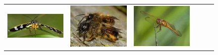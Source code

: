 \begin{figure}
\begin{tabular}{m{.01\linewidth} m{.16\linewidth} m{.16\linewidth} m{.16\linewidth} m{.16\linewidth} m{.16\linewidth}}
    \includegraphics[width=\linewidth]{../style/figures/flickr_on_flickr/pred_style_Macro/1.jpg} &
    \includegraphics[width=\linewidth]{../style/figures/flickr_on_flickr/pred_style_Macro/2.jpg} &
    \includegraphics[width=\linewidth]{../style/figures/flickr_on_flickr/pred_style_Macro/3.jpg} &

\end{tabular}
\end{figure}
